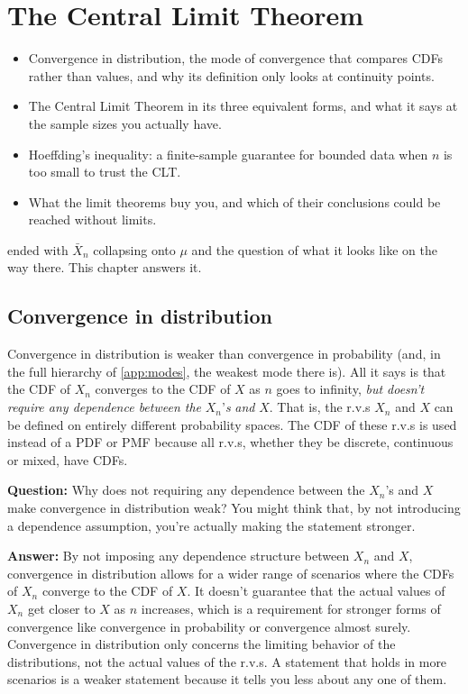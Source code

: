 \chapter{The Central Limit Theorem}
\label{ch:clt}

\begin{chaptergoals}
\begin{itemize}[nosep]
\item Convergence in distribution, the mode of convergence that compares CDFs rather than values, and why its definition only looks at continuity points.
\item The Central Limit Theorem in its three equivalent forms, and what it says at the sample sizes you actually have.
\item Hoeffding's inequality: a finite-sample guarantee for bounded data when $n$ is too small to trust the CLT.
\item What the limit theorems buy you, and which of their conclusions could be reached without limits.
\end{itemize}
 ended with $\bar{X}_n$ collapsing onto $\mu$ and the question of what it looks like on the way there. This chapter answers it.
\end{chaptergoals}

\section{Convergence in distribution}
\label{sec:conv-dist}

Convergence in distribution is weaker than convergence in probability (and, in the full hierarchy of \cref{app:modes}, the weakest mode there is).
All it says is that the CDF of $X_n$ converges to the CDF of $X$ as $n$ goes to infinity, \textit{but doesn't require any dependence between the} $X_n$'\textit{s} \textit{and} $X$.
That is, the r.v.s $X_n$ and $X$ can be defined on entirely different probability spaces.
The CDF of these r.v.s is used instead of a PDF or PMF because all r.v.s, whether they be discrete, continuous or mixed, have CDFs.

\textbf{Question:} Why does not requiring any dependence between the $X_n$'s and $X$ make convergence in distribution weak?
You might think that, by not introducing a dependence assumption, you're actually making the statement stronger.

\textbf{Answer:} By not imposing any dependence structure between $X_n$ and $X$, convergence in distribution allows for a wider range of scenarios where the CDFs of $X_n$ converge to the CDF of $X$.
It doesn't guarantee that the actual values of $X_n$ get closer to $X$ as $n$ increases, which is a requirement for stronger forms of convergence like convergence in probability or convergence almost surely.
Convergence in distribution only concerns the limiting behavior of the distributions, not the actual values of the r.v.s.
A statement that holds in more scenarios is a weaker statement because it tells you less about any one of them.

